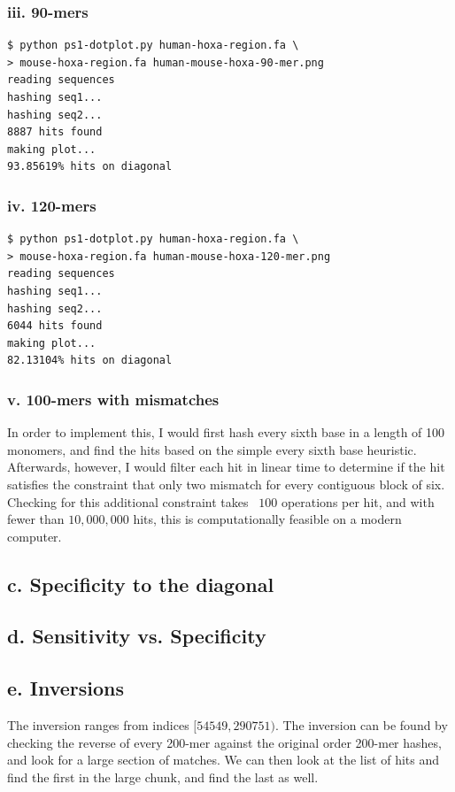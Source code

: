 \documentclass[a4paper]{article}
\begin{document}
\subsubsection*{iii. 90-mers}
\begin{verbatim}
$ python ps1-dotplot.py human-hoxa-region.fa \
> mouse-hoxa-region.fa human-mouse-hoxa-90-mer.png
reading sequences
hashing seq1...
hashing seq2...
8887 hits found
making plot...
93.85619% hits on diagonal
\end{verbatim}

\subsubsection*{iv. 120-mers}
\begin{verbatim}
$ python ps1-dotplot.py human-hoxa-region.fa \
> mouse-hoxa-region.fa human-mouse-hoxa-120-mer.png
reading sequences
hashing seq1...
hashing seq2...
6044 hits found
making plot...
82.13104% hits on diagonal
\end{verbatim}

\subsubsection*{v. 100-mers with mismatches}
In order to implement this, I would first hash every sixth
base in a length of 100 monomers, and find the hits 
based on the simple every sixth base heuristic. Afterwards,
however, I would filter each hit in linear time to determine
if the hit satisfies the constraint that only two mismatch
for every contiguous block of six. Checking for this
additional constraint takes ~$100$ operations per hit,
and with fewer than $10,000,000$ hits, this is computationally
feasible on a modern computer.

\subsection*{c. Specificity to the diagonal}


\subsection*{d. Sensitivity vs. Specificity}


\subsection*{e. Inversions}
The inversion ranges from indices $[54549, 290751)$. The
inversion can be found by checking the reverse of every 200-mer
against the original order 200-mer hashes, and look for a
large section of matches. We can then look at the list of
hits and find the first in the large chunk, and find the last
as well.
\end{document}
